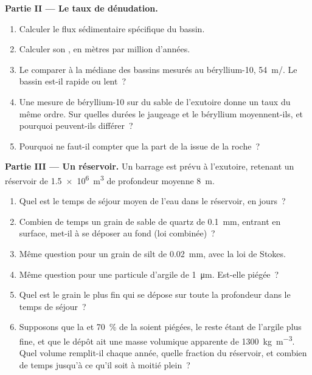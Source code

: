 \begin{problem}
\medskip
\noindent\textbf{Partie II --- Le taux de dénudation.}
\begin{enumerate}[resume]
  \item Calculer le flux sédimentaire spécifique du bassin.
  \item Calculer son , en mètres par million d'années.
  \item Le comparer à la médiane des bassins mesurés au béryllium-10,
        \qty{54}{m/\Ma}. Le bassin est-il rapide ou lent~?
  \item Une mesure de béryllium-10 sur du sable de l'exutoire donne un taux du
        même ordre. Sur quelles durées le jaugeage et le béryllium
        moyennent-ils, et pourquoi peuvent-ils différer~?
  \item Pourquoi ne faut-il compter que la part de la  issue de la roche~?
\end{enumerate}

\medskip
\noindent\textbf{Partie III --- Un réservoir.}
Un barrage est prévu à l'exutoire, retenant un réservoir de
\qty{1.5e6}{m^3} de profondeur moyenne \qty{8}{m}.
\begin{enumerate}[resume]
  \item Quel est le temps de séjour moyen de l'eau dans le réservoir, en
        jours~?
  \item Combien de temps un grain de sable de quartz de \qty{0.1}{mm}, entrant en
        surface, met-il à se déposer au fond (loi combinée)~?
  \item Même question pour un grain de silt de \qty{0.02}{mm}, avec la loi de Stokes.
  \item Même question pour une particule d'argile de \qty{1}{\micro m}. Est-elle
        piégée~?
  \item Quel est le grain le plus fin qui se dépose sur toute la profondeur dans
        le temps de séjour~?
  \item Supposons que la  et \qty{70}{\percent} de la  soient piégées, le reste étant de l'argile plus fine, et que le dépôt ait
        une masse volumique apparente de \qty{1300}{kg.m^{-3}}. Quel volume remplit-il chaque
        année, quelle fraction du réservoir, et combien de temps jusqu'à ce qu'il soit à moitié
        plein~?
\end{enumerate}


\end{problem}
